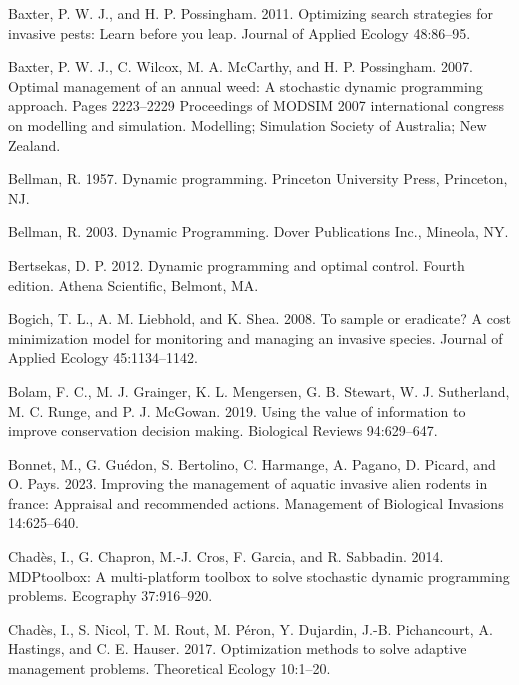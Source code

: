 \documentclass[
  11pt,
  a4paper,
]{article}
\newlength{\cslhangindent}
\newenvironment{CSLReferences}[2] %
 {\begin{list}{}{%
  \setlength{\itemindent}{0pt}
  \setlength{\leftmargin}{0pt}
  \setlength{\parsep}{0pt}
  \ifodd #1
   \setlength{\leftmargin}{\cslhangindent}
   \setlength{\itemindent}{-1\cslhangindent}
  \fi
  \setlength{\itemsep}{#2\baselineskip}}}
 {\end{list}}
\begin{document}
\protect{}\label{refs}
\begin{CSLReferences}{1}{0}
Baxter, P. W. J., and H. P. Possingham. 2011. Optimizing search strategies for invasive pests: Learn before you leap. Journal of Applied Ecology 48:86--95.

Baxter, P. W. J., C. Wilcox, M. A. McCarthy, and H. P. Possingham. 2007. Optimal management of an annual weed: A stochastic dynamic programming approach. Pages 2223--2229 Proceedings of MODSIM 2007 international congress on modelling and simulation. Modelling; Simulation Society of Australia; New Zealand.

Bellman, R. 1957. Dynamic programming. Princeton University Press, Princeton, NJ.

Bellman, R. 2003. {Dynamic Programming}. Dover Publications Inc., Mineola, NY.

Bertsekas, D. P. 2012. Dynamic programming and optimal control. Fourth edition. Athena Scientific, Belmont, MA.

Bogich, T. L., A. M. Liebhold, and K. Shea. 2008. To sample or eradicate? {A} cost minimization model for monitoring and managing an invasive species. Journal of Applied Ecology 45:1134--1142.

Bolam, F. C., M. J. Grainger, K. L. Mengersen, G. B. Stewart, W. J. Sutherland, M. C. Runge, and P. J. McGowan. 2019. Using the value of information to improve conservation decision making. Biological Reviews 94:629--647.

Bonnet, M., G. Guédon, S. Bertolino, C. Harmange, A. Pagano, D. Picard, and O. Pays. 2023. Improving the management of aquatic invasive alien rodents in france: Appraisal and recommended actions. Management of Biological Invasions 14:625--640.

Chadès, I., G. Chapron, M.-J. Cros, F. Garcia, and R. Sabbadin. 2014. MDPtoolbox: A multi-platform toolbox to solve stochastic dynamic programming problems. Ecography 37:916--920.

Chadès, I., S. Nicol, T. M. Rout, M. Péron, Y. Dujardin, J.-B. Pichancourt, A. Hastings, and C. E. Hauser. 2017. Optimization methods to solve adaptive management problems. Theoretical Ecology 10:1--20.


\end{CSLReferences}
\end{document}
